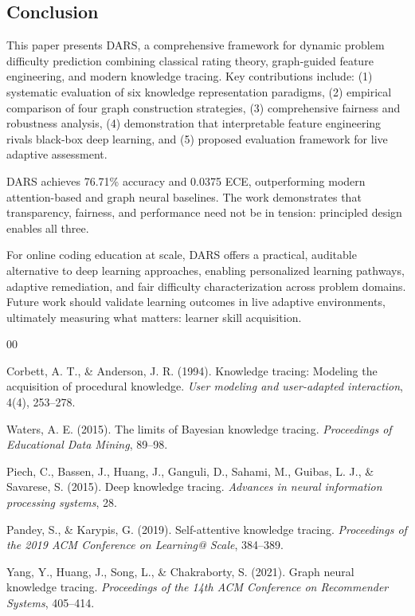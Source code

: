 \documentclass[conference]{IEEEtran}
\begin{document}
\begin{enumerate}
\section{Conclusion}

This paper presents DARS, a comprehensive framework for dynamic problem difficulty prediction combining classical rating theory, graph-guided feature engineering, and modern knowledge tracing. Key contributions include: (1) systematic evaluation of six knowledge representation paradigms, (2) empirical comparison of four graph construction strategies, (3) comprehensive fairness and robustness analysis, (4) demonstration that interpretable feature engineering rivals black-box deep learning, and (5) proposed evaluation framework for live adaptive assessment.

DARS achieves 76.71\% accuracy and 0.0375 ECE, outperforming modern attention-based and graph neural baselines. The work demonstrates that transparency, fairness, and performance need not be in tension: principled design enables all three.

For online coding education at scale, DARS offers a practical, auditable alternative to deep learning approaches, enabling personalized learning pathways, adaptive remediation, and fair difficulty characterization across problem domains. Future work should validate learning outcomes in live adaptive environments, ultimately measuring what matters: learner skill acquisition.

\begin{thebibliography}{00}

Corbett, A. T., \& Anderson, J. R. (1994). Knowledge tracing: Modeling the acquisition of procedural knowledge. \textit{User modeling and user-adapted interaction}, 4(4), 253--278.

Waters, A. E. (2015). The limits of Bayesian knowledge tracing. \textit{Proceedings of Educational Data Mining}, 89--98.

Piech, C., Bassen, J., Huang, J., Ganguli, D., Sahami, M., Guibas, L. J., \& Savarese, S. (2015). Deep knowledge tracing. \textit{Advances in neural information processing systems}, 28.

Pandey, S., \& Karypis, G. (2019). Self-attentive knowledge tracing. \textit{Proceedings of the 2019 ACM Conference on Learning@ Scale}, 384--389.

Yang, Y., Huang, J., Song, L., \& Chakraborty, S. (2021). Graph neural knowledge tracing. \textit{Proceedings of the 14th ACM Conference on Recommender Systems}, 405--414.


\end{thebibliography}
\end{enumerate}
\end{document}
